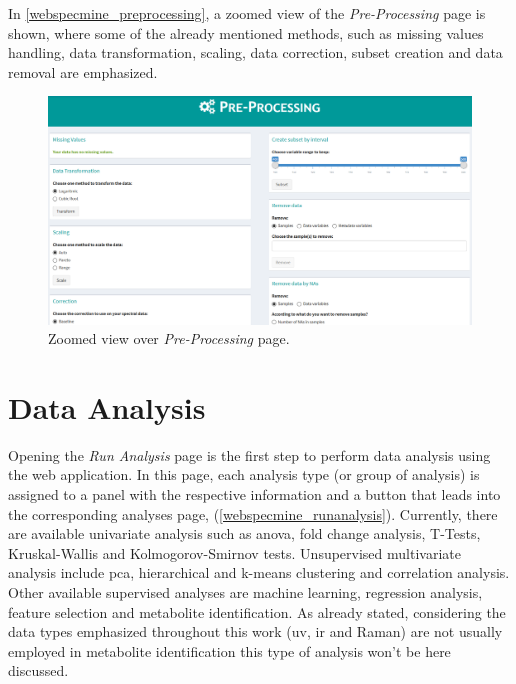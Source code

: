 In \autoref{webspecmine_preprocessing}, a zoomed view of the \textit{Pre-Processing} page is shown, where some of the already mentioned methods, such as missing values handling, data transformation, scaling, data correction, subset creation and data removal are emphasized.


\begin{figure}[h]
	\centering
	\includegraphics[width=1\linewidth]{Imagens/webspecmine_preprocessing}
	\caption{Zoomed view over \textit{Pre-Processing} page.}
	\label{webspecmine_preprocessing}
\end{figure}



\section{Data Analysis}

Opening the \textit{Run Analysis} page is the first step to perform data analysis using the web application. In this page, each analysis type (or group of analysis) is assigned to a panel with the respective information and a button that leads into the corresponding analyses page, (\autoref{webspecmine_runanalysis}). Currently, there are available univariate analysis such as \gls{anova}, fold change analysis, T-Tests, Kruskal-Wallis and Kolmogorov-Smirnov tests. Unsupervised multivariate analysis include \gls{pca}, hierarchical and k-means clustering and correlation analysis. Other available supervised analyses are machine learning, regression analysis, feature selection and metabolite identification. As already stated, considering the data types emphasized throughout this work (\gls{uv}, \gls{ir} and Raman) are not usually employed in metabolite identification this type of analysis won't be here discussed. 

